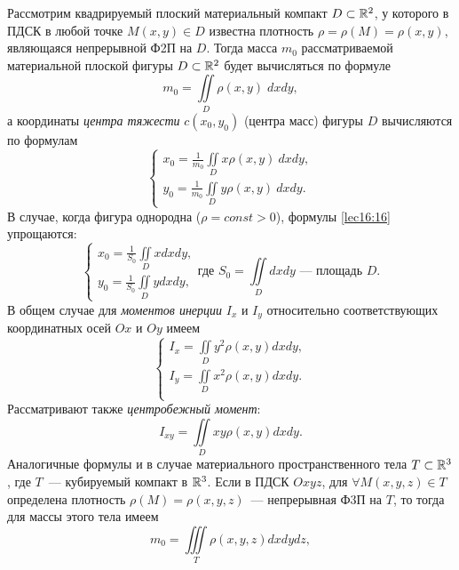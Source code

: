 \documentclass[../../main.tex]{subfiles}
\begin{document}
Рассмотрим квадрируемый плоский материальный компакт
$D \subset \mathbb{R}^{2}$, у которого в ПДСК в любой точке $M(x, y) \in D$ известна
плотность $\rho = \rho(M) = \rho(x,y)$, являющаяся непрерывной Ф2П на $D$. 
Тогда
масса $m_0$ рассматриваемой материальной плоской фигуры $D \subset \mathbb{R}^{2}$
будет вычисляться по формуле
\begin{equation}
\label{lec16:15}
m_0 = \iint\limits_D \rho(x, y) \; dxdy,
\end{equation}
а координаты \emph{центра тяжести} $c(x_0, y_0)$ (центра масс)
фигуры $D$ вычисляются по формулам
\begin{equation}
\label{lec16:16}
\begin{cases}
	x_0 = \frac{1}{m_0}\iint\limits_D x\rho(x,y)\: dx dy,\\
	y_0 = \frac{1}{m_0}\iint\limits_D y\rho(x,y)\: dx dy.
	\end{cases}
\end{equation}
В случае, когда фигура однородна ($\rho=const>0$),
 формулы \eqref{lec16:16} упрощаются:
 \begin{equation*}
 \begin{cases}
 	x_0 = \frac{1}{S_0}\iint\limits_D x dx dy,\\
 	y_0 =\frac{1}{S_0}\iint\limits_D y dx dy,
 	\end{cases}
 \text{где } S_0=\iint\limits_D dxdy\text{~--- площадь }D.
 \end{equation*}
В общем случае для \emph{моментов инерции} $I_x$ и $I_y$ относительно 
соответствующих 
координатных
осей $Ox$ и $Oy$ имеем
\begin{equation}
\label{lec16:17}
\begin{cases}
	I_x = \iint\limits_Dy^2\rho(x, y) dx dy,\\
	I_y = \iint\limits_Dx^2\rho(x, y) dx dy.\\
	\end{cases}
\end{equation}
Рассматривают также \emph{центробежный момент}:
\begin{equation}
\label{lec16:18}
I_{xy} = \iint\limits_Dxy\rho(x, y) dx dy.
\end{equation}
Аналогичные формулы и в случае материального пространственного тела
$T \subset \mathbb{R}^{3}$, где $T$~--- кубируемый компакт в $\mathbb{R}^{3}$.
Если в ПДСК $Oxyz$, для $\forall M(x, y, z) \in T$ определена плотность $\rho 
(M) =
\rho(x, y, z)$~--- непрерывная Ф3П на $T$, то тогда для массы этого тела имеем
\begin{equation}
\label{lec16:19}
m_0 = \iiint\limits_T \rho(x, y, z) dx dy dz,
\end{equation}
\end{document}
